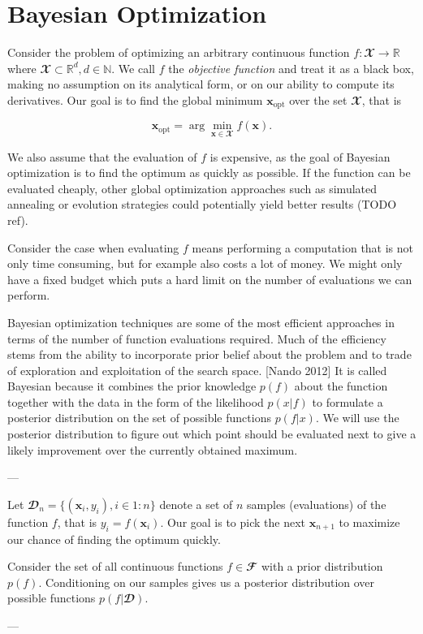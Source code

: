 \section{Bayesian Optimization}

Consider the problem of optimizing an arbitrary continuous function $f: 𝓧 → ℝ$
where $𝓧 ⊂ ℝ^d, d ∈ ℕ$. We call $f$ the \emph{objective function} and treat it
as a black box, making no assumption on its analytical form, or on our ability
to compute its derivatives. Our goal is to find the global minimum
$\symbf{x}_\text{opt}$ over the set $𝓧$, that is

$$
  \symbf{x}_\text{opt} = \arg\min_{\symbf{x} ∈ 𝓧} f(\symbf{x}).
$$

We also assume that the evaluation of $f$ is expensive, as the goal of Bayesian
optimization is to find the optimum as quickly as possible. If the function can
be evaluated cheaply, other global optimization approaches such as simulated
annealing or evolution strategies could potentially yield better results (TODO
ref).

Consider the case when evaluating $f$ means performing a computation that is
not only time consuming, but for example also costs a lot of money. We might
only have a fixed budget which puts a hard limit on the number of evaluations
we can perform.

Bayesian optimization techniques are some of the most efficient approaches in
terms of the number of function evaluations required. Much of the efficiency
stems from the ability to incorporate prior belief about the problem and to
trade of exploration and exploitation of the search space. [Nando 2012] It is
called Bayesian because it combines the prior knowledge $p(f)$ about the
function together with the data in the form of the likelihood $p(x|f)$ to
formulate a posterior distribution on the set of possible functions $p(f|x)$.
We will use the posterior distribution to figure out which point should be
evaluated next to give a likely improvement over the currently obtained
maximum.

---

Let $𝓓_n = \{ (\symbf{x}_i, y_i), i \in 1:n\}$ denote a set of $n$ samples
(evaluations) of the function $f$, that is $y_i = f(\symbf{x}_i)$. Our goal is
to pick the next $\symbf{x}_{n+1}$ to maximize our chance of finding the
optimum quickly.

Consider the set of all continuous functions $f ∈ 𝓕$ with a prior distribution
$p(f)$.  Conditioning on our samples gives us a posterior distribution over
possible functions $p(f | 𝓓)$.

---

